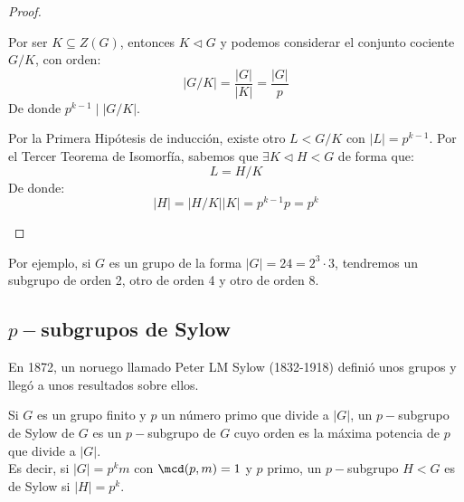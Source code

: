 \begin{teo}
\begin{proof}
\begin{itemize}
\begin{itemize}
\begin{itemize}
                                Por ser $K\subseteq Z(G)$, entonces $K\lhd G$ y podemos considerar el conjunto cociente $G/K$, con orden:
                                \begin{equation*}
                                    |G/K| = \dfrac{|G|}{|K|} = \dfrac{|G|}{p} 
                                \end{equation*}
                                De donde $p^{k-1} \mid |G/K|$.

                                Por la Primera Hipótesis de inducción, existe otro $L<G/K$ con $|L| = p^{k-1}$. Por el Tercer Teorema de Isomorfía, sabemos que $\exists K\lhd H < G$ de forma que:
                                \begin{equation*}
                                    L = H/K
                                \end{equation*}
                                De donde:
                                \begin{equation*}
                                    |H| = |H/K| |K| = p^{k-1} p = p^k
                                \end{equation*}
                        \end{itemize}
                        
                \end{itemize}
        \end{itemize}
    \end{proof}
\end{teo}

\begin{ejemplo}
    Por ejemplo, si $G$ es un grupo de la forma $|G| = 24 = 2^3 \cdot 3$, tendremos un subgrupo de orden 2, otro de orden 4 y otro de orden 8.
\end{ejemplo}

\subsection{$p-$subgrupos de Sylow}
\noindent
En 1872, un noruego llamado Peter LM Sylow (1832-1918) definió unos grupos y llegó a unos resultados sobre ellos.

\begin{definicion}
    Si $G$ es un grupo finito y $p$ un número primo que divide a $|G|$, un $p-$subgrupo de Sylow de $G$ es un $p-$subgrupo de $G$ cuyo orden es la máxima potencia de $p$ que divide a $|G|$.\\

    \noindent
    Es decir, si $|G| = p^km$ con $\mcd(p,m)=1$ y $p$ primo, un $p-$subgrupo $H<G$ es de Sylow si $|H| = p^k$.
\end{definicion}

